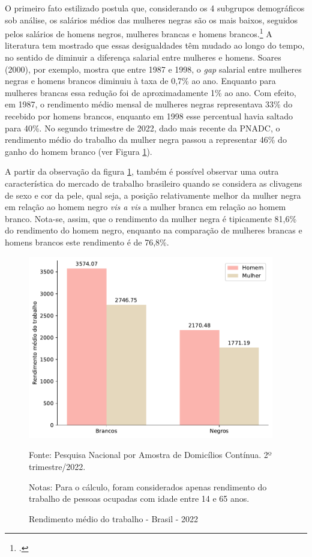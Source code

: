 \documentclass[12pt]{article}
\begin{document}
\par O primeiro fato estilizado postula que, considerando os 4 subgrupos de\-mo\-grá\-fi\-cos sob análise, os salários médios das mulheres negras são os mais baixos, seguidos pelos salários de homens negros, mulheres brancas e homens brancos.\footcite{soares2000perfil,campante2004desigualdade} A literatura tem mostrado que essas desigualdades têm mudado ao longo do tempo, no sentido de diminuir a diferença salarial entre mulheres e homens. Soares (2000), por exemplo, mostra que entre 1987 e 1998, o \textit{gap} salarial entre mulheres negras e homens brancos diminuiu à taxa de 0,7\% ao ano. Enquanto para mulheres brancas essa redução foi de aproximadamente 1\% ao ano. Com efeito, em 1987, o rendimento médio mensal de mulheres negras representava 33\% do recebido por homens brancos, enquanto em 1998 esse percentual havia saltado para 40\%. No segundo trimestre de 2022, dado mais recente da PNADC, o rendimento médio do trabalho da mulher negra passou a representar 46\% do ganho do homem branco (ver Figura \ref{fig:rendimento_trabalho}). 

\par A partir da observação da figura \ref{fig:rendimento_trabalho}, também é possível observar uma outra característica do mercado de trabalho brasileiro quando se considera as clivagens de sexo e cor da pele, qual seja, a posição relativamente melhor da mulher negra em relação ao homem negro \textit{vis a vis} a mulher branca em relação ao homem branco. Nota-se, assim, que o rendimento da mulher negra é tipicamente 81,6\% do rendimento do homem negro, enquanto na comparação de mulheres brancas e homens brancos este rendimento é de 76,8\%.


\begin{figure}[H]
    \centering
    \caption{Rendimento médio do trabalho - Brasil - 2022}
        \includegraphics[height=8cm]{../figures/wage_2002_group.pdf}
    \label{fig:rendimento_trabalho}
    \begin{floatnotes}
        \item[Fonte:] Pesquisa Nacional por Amostra de Domicílios Contínua. 2º trimestre/2022.
        \item[Notas:] Para o cálculo, foram considerados apenas rendimento do trabalho de pessoas ocupadas com idade entre 14 e 65 anos.
    \end{floatnotes}
\end{figure}
\end{document}
